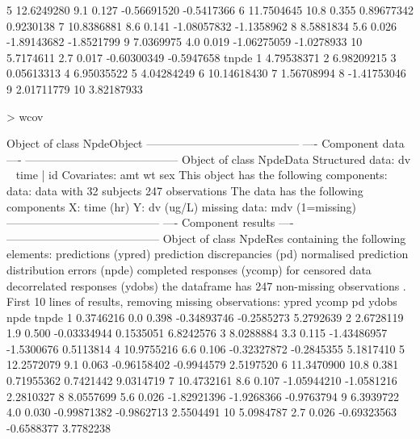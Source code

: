 \documentclass{report}
\begin{document}
\begin{mdframed}[backgroundcolor=green!13]
\begin{Schunk}
\begin{Soutput}
5  12.6249280   9.1 0.127 -0.56691520 -0.5417366
6  11.7504645  10.8 0.355  0.89677342  0.9230138
7  10.8386881   8.6 0.141 -1.08057832 -1.1358962
8   8.5881834   5.6 0.026 -1.89143682 -1.8521799
9   7.0369975   4.0 0.019 -1.06275059 -1.0278933
10  5.7174611   2.7 0.017 -0.60300349 -0.5947658
         tnpde
1   4.79538371
2   6.98209215
3   0.05613313
4   6.95035522
5   4.04284249
6  10.14618430
7   1.56708994
8  -1.41753046
9   2.01711779
10  3.82187933
\end{Soutput}
\begin{Sinput}
> wcov
\end{Sinput}
\begin{Soutput}
Object of class NpdeObject
-----------------------------------------
----        Component data           ----
-----------------------------------------
Object of class NpdeData
    Structured data: dv ~ time | id 
    Covariates: amt wt sex 
This object has the following components:
     data: data
     with 32 subjects
      247 observations
The data has the following components
     X: time (hr) 
     Y: dv (ug/L) 
     missing data: mdv  (1=missing)
-----------------------------------------
----        Component results        ----
-----------------------------------------
Object of class NpdeRes
  containing the following elements:
    predictions (ypred)
    prediction discrepancies (pd)
    normalised prediction distribution errors (npde)
    completed responses (ycomp) for censored data
    decorrelated responses (ydobs)
  the dataframe has  247 non-missing observations .
First 10 lines of results, removing missing observations:
        ypred ycomp    pd       ydobs       npde      tnpde
1   0.3746216   0.0 0.398 -0.34893746 -0.2585273  5.2792639
2   2.6728119   1.9 0.500 -0.03334944  0.1535051  6.8242576
3   8.0288884   3.3 0.115 -1.43486957 -1.5300676  0.5113814
4  10.9755216   6.6 0.106 -0.32327872 -0.2845355  5.1817410
5  12.2572079   9.1 0.063 -0.96158402 -0.9944579  2.5197520
6  11.3470900  10.8 0.381  0.71955362  0.7421442  9.0314719
7  10.4732161   8.6 0.107 -1.05944210 -1.0581216  2.2810327
8   8.0557699   5.6 0.026 -1.82921396 -1.9268366 -0.9763794
9   6.3939722   4.0 0.030 -0.99871382 -0.9862713  2.5504491
10  5.0984787   2.7 0.026 -0.69323563 -0.6588377  3.7782238
\end{Soutput}
\end{Schunk}
\end{mdframed}

\end{document}
